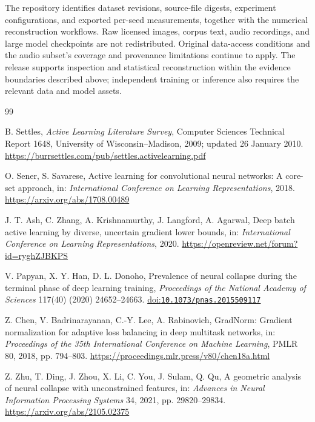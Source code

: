 \documentclass[10pt,a4paper,twocolumn]{article}
\providecommand{\doi}[1]{%
  \href{https://doi.org/#1}{doi:\nolinkurl{#1}}}
\begin{document}
The repository identifies dataset revisions, source-file digests,
experiment configurations, and exported per-seed measurements, together
with the numerical reconstruction workflows. Raw licensed images,
corpus text, audio recordings, and large model checkpoints are not
redistributed. Original data-access conditions and the audio subset's
coverage and provenance limitations continue to apply. The release
supports inspection and statistical reconstruction within the evidence
boundaries described above; independent training or inference also
requires the relevant data and model assets.


\FloatBarrier
\begingroup
\small


\begin{thebibliography}{99}

B. Settles,
\emph{Active Learning Literature Survey},
Computer Sciences Technical Report 1648,
University of Wisconsin--Madison, 2009; updated 26 January 2010.
\url{https://burrsettles.com/pub/settles.activelearning.pdf}

O. Sener, S. Savarese,
Active learning for convolutional neural networks:
A core-set approach,
in: \emph{International Conference on Learning Representations}, 2018.
\url{https://arxiv.org/abs/1708.00489}

J. T. Ash, C. Zhang, A. Krishnamurthy, J. Langford, A. Agarwal,
Deep batch active learning by diverse, uncertain gradient lower bounds,
in: \emph{International Conference on Learning Representations}, 2020.
\url{https://openreview.net/forum?id=ryghZJBKPS}

V. Papyan, X. Y. Han, D. L. Donoho,
Prevalence of neural collapse during the terminal phase of
deep learning training,
\emph{Proceedings of the National Academy of Sciences}
117(40) (2020) 24652--24663.
\doi{10.1073/pnas.2015509117}

Z. Chen, V. Badrinarayanan, C.-Y. Lee, A. Rabinovich,
GradNorm: Gradient normalization for adaptive loss balancing in deep multitask networks,
in: \emph{Proceedings of the 35th International Conference
on Machine Learning}, PMLR 80, 2018, pp. 794--803.
\url{https://proceedings.mlr.press/v80/chen18a.html}

Z. Zhu, T. Ding, J. Zhou, X. Li, C. You, J. Sulam, Q. Qu,
A geometric analysis of neural collapse with unconstrained features,
in: \emph{Advances in Neural Information Processing Systems}
34, 2021, pp. 29820--29834.
\url{https://arxiv.org/abs/2105.02375}


\end{thebibliography}
\end{document}
